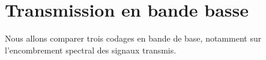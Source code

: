 \documentclass[11pt, openright]{book}
\begin{document}
\begin{figure}[ht!]
\begin{floatrow}

	\end{floatrow}
\end{figure}

\section{Transmission en bande basse}

Nous allons comparer trois codages en bande de base, notamment sur l’encombrement
spectral des signaux transmis.
\end{document}
